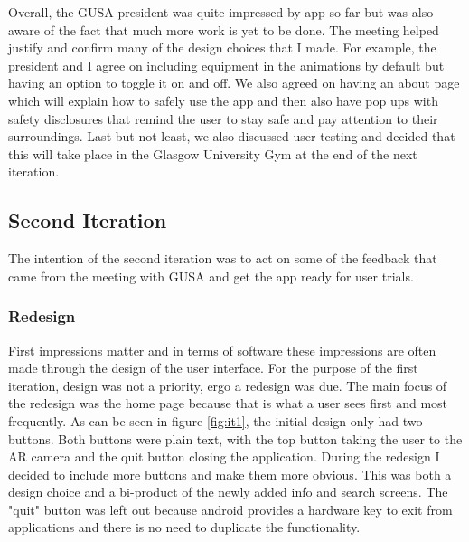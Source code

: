 \documentclass{l4proj}
\begin{document}
Overall, the GUSA president was quite impressed by app so far but was also aware of the fact that much more work is yet to be done. The meeting helped justify and confirm many of the design choices that I made. For example, the president and I agree on including equipment in the animations by default but having an option to toggle it on and off. We also agreed on having an about page which will explain how to safely use the app and then also have pop ups with safety disclosures that remind the user to stay safe and pay attention to their surroundings. Last but not least, we also discussed user testing and decided that this will take place in the Glasgow University Gym at the end of the next iteration.

\subsection{Second Iteration}
The intention of the second iteration was to act on some of the feedback that came from the meeting with GUSA and get the app ready for user trials.

\subsubsection{Redesign}
First impressions matter and in terms of software these impressions are often made through the design of the user interface. For the purpose of the first iteration, design was not a priority, ergo a redesign was due. The main focus of the redesign was the home page because that is what a user sees first and most frequently. As can be seen in figure \ref{fig:it1}, the initial design only had two buttons. Both buttons were plain text, with the top button taking the user to the AR camera and the quit button closing the application. During the redesign I decided to include more buttons and make them more obvious. This was both a design choice and a bi-product of the newly added info and search screens. The "quit" button was left out because android provides a hardware key to exit from applications and there is no need to duplicate the functionality. 
\end{document}
